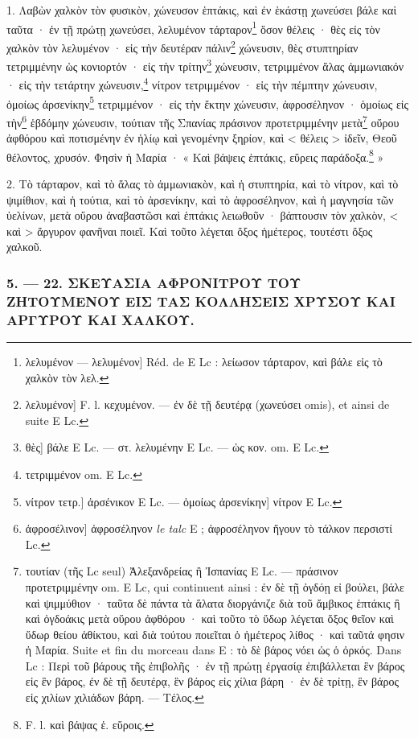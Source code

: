 \documentclass[a4paper, 11pt, oneside, polutonikogreek, french]{article}
\begin{document}
1. Λαβὼν χαλκὸν τὸν φυσικὸν, χώνευσον ἑπτάκις, καὶ ἐν ἑκάστῃ χωνεύσει βάλε καὶ ταῦτα · ἐν τῇ πρώτῃ χωνεύσει, λελυμένον τάρταρον\footnote{λελυμένον --- λελυμένον] Réd. de E Lc : λείωσον τάρταρον, καὶ βάλε εἰς τὸ χαλκὸν τὸν λελ.} ὅσον θέλεις · θὲς εἰς τὸν χαλκὸν τὸν λελυμένον · εἰς τὴν δευτέραν πάλιν\footnote{λελυμένον] F. l. κεχυμένον. --- ἐν δὲ τῇ δευτέρᾳ (χωνεύσει omis), et ainsi de suite E Lc.} χώνευσιν, θὲς στυπτηρίαν τετριμμένην ὡς κονιορτόν · εἰς τὴν τρίτην\footnote{θὲς] βάλε E Lc. --- στ. λελυμένην E Lc. --- ὡς κον. om. E Lc.} χώνευσιν, τετριμμένον ἅλας ἀμμωνιακόν · εἰς τὴν τετάρτην χώνευσιν,\footnote{τετριμμένον om. E Lc.} νίτρον τετριμμένον · εἰς τὴν πέμπτην χώνευσιν, ὁμοίως ἀρσενίκην\footnote{νίτρον τετρ.] ἀρσένικον E Lc. --- ὁμοίως ἀρσενίκην] νίτρον E Lc.} τετριμμένον · εἰς τὴν ἕκτην χώνευσιν, ἀφροσέληνον · ὁμοίως εἰς τὴν\footnote{ἀφροσέλινον] ἀφροσέληνον \emph{le talc} E ; ἀφροσέληνον ἤγουν τὸ τάλκον περσιστί Lc.} ἑβδόμην χώνευσιν, τούτιαν τῆς Σπανίας πράσινον προτετριμμένην μετὰ\footnote{τουτίαν (τῆς Lc seul) Ἀλεξανδρείας ἢ Ἰσπανίας E Lc. --- πράσινον προτετριμμένην om. E Lc, qui continuent ainsi : ἐν δὲ τῇ ὀγδόῃ εἰ βούλει, βάλε καὶ ψιμμύθιον · ταῦτα δὲ πάντα τὰ ἅλατα διοργάνιζε διὰ τοῦ ἄμβικος ἑπτάκις ἢ καὶ ὀγδοάκις μετὰ οὕρου ἀφθόρου · καὶ τοῦτο τὸ ὕδωρ λέγεται ὄξος θεῖον καὶ ὕδωρ θείου ἀθίκτου, καὶ διὰ τούτου ποιεῖται ὁ ἡμέτερος λίθος · καὶ ταῦτά φησιν ἡ Μαρία. Suite et fin du morceau dans E : τὸ δὲ βάρος νόει ὡς ὁ ὀρκός. Dans Lc : Περὶ τοῦ βάρους τῆς ἐπιβολῆς · ἐν τῇ πρώτῃ ἐργασίᾳ ἐπιβάλλεται ἓν βάρος εἰς ἓν βάρος, ἐν δὲ τῇ δευτέρᾳ, ἓν βάρος εἰς χίλια βάρη · ἐν δὲ τρίτῃ, ἓν βάρος εἰς χιλίων χιλιάδων βάρη. --- Τέλος.} οὔρου ἀφθόρου καὶ ποτισμένην ἐν ἡλίῳ καὶ γενομένην ξηρίον, καὶ < θέλεις > ἰδεῖν, Θεοῦ θέλοντος, χρυσόν. Φησὶν ἡ Μαρία · « Καὶ βάψεις ἑπτάκις, εὕρεις παράδοξα.\footnote{F. l. καὶ βάψας ἑ. εὕροις.} »

2. Τὸ τάρταρον, καὶ τὸ ἅλας τὸ ἀμμωνιακὸν, καὶ ἡ στυπτηρία, καὶ τὸ νίτρον, καὶ τὸ ψιμίθιον, καὶ ἡ τούτια, καὶ τὸ ἀρσενίκην, καὶ τὸ ἀφροσέληνον, καὶ ἡ μαγνησία τῶν ὑελίνων, μετὰ οὔρου ἀναβαστῶσι καὶ ἑπτάκις λειωθοῦν · βάπτουσιν τὸν χαλκὸν, < καὶ > ἄργυρον φανῆναι ποιεῖ. Καὶ τοῦτο λέγεται ὄξος ἡμέτερος, τουτέστι ὄξος χαλκοῦ.

\bigskip
\centerline{\EightStarTaper}
\centerline{\EightStarTaper\EightStarTaper}
\bigskip

\subsubsection{5. --- 22. ΣΚΕΥΑΣΙΑ ΑΦΡΟΝΙΤΡΟΥ ΤΟΥ ΖΗΤΟΥΜΕΝΟΥ ΕΙΣ ΤΑΣ ΚΟΛΛΗΣΕΙΣ ΧΡΥΣΟΥ ΚΑΙ ΑΡΓΥΡΟΥ ΚΑΙ ΧΑΛΚΟΥ.}
\end{document}
